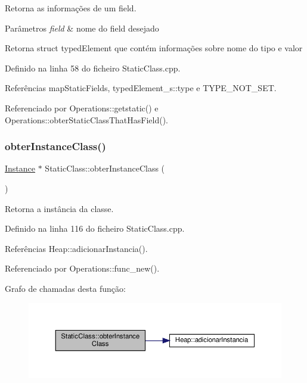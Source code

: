 Retorna as informações de um field. 


\begin{DoxyParams}{Parâmetros}
{\em field} & nome do field desejado \\
\hline
\end{DoxyParams}
\begin{DoxyReturn}{Retorna}
struct typed\+Element que contém informações sobre nome do tipo e valor 
\end{DoxyReturn}


Definido na linha 58 do ficheiro Static\+Class.\+cpp.



Referências map\+Static\+Fields, typed\+Element\+\_\+s\+::type e T\+Y\+P\+E\+\_\+\+N\+O\+T\+\_\+\+S\+ET.



Referenciado por Operations\+::getstatic() e Operations\+::obter\+Static\+Class\+That\+Has\+Field().

\mbox{\label{classStaticClass_a2990aa887bcb06eaec53afe467e361ef}} 
\subsubsection{\texorpdfstring{obter\+Instance\+Class()}{obterInstanceClass()}}
{\footnotesize\ttfamily \hyperlink{classInstance}{Instance} $\ast$ Static\+Class\+::obter\+Instance\+Class (\begin{DoxyParamCaption}{ }\end{DoxyParamCaption})}



Retorna a instância da classe. 



Definido na linha 116 do ficheiro Static\+Class.\+cpp.



Referências Heap\+::adicionar\+Instancia().



Referenciado por Operations\+::func\+\_\+new().

Grafo de chamadas desta função\+:
\nopagebreak
\begin{figure}[H]
\begin{center}
\leavevmode
\includegraphics[width=350pt]{classStaticClass_a2990aa887bcb06eaec53afe467e361ef_cgraph}
\end{center}
\end{figure}


